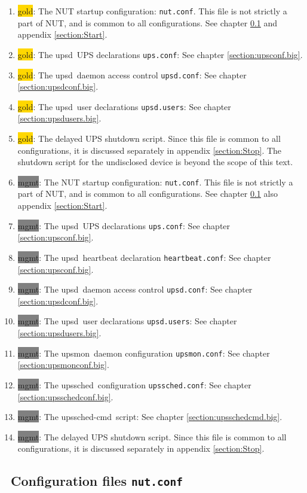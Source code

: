 \documentclass[12pt]{article}
\newlength{\headersep}\setlength{\headersep}{3mm}
\newcommand{\Hsep}{\hspace{\headersep}}
\newcommand{\upsd}{\mbox{\textcolor{UPSDCOLOUR}{upsd}}}
\newcommand{\upsmon}{\mbox{\textcolor{MONCOLOUR}{upsmon}}}
\newcommand{\upssched}{\mbox{\textcolor{SCHEDCOLOUR}{upssched}}}
\newcommand{\upsschedcmd}{\mbox{\textcolor{CMDCOLOUR}{upssched-cmd}}}
\newcommand{\gold}[1][gold]{\colorbox{GOLD}{#1}}
\newcommand{\mgmt}[1][mgmt]{\colorbox{GRAY}{#1}}
\newcommand{\nutconf}{\textcolor{NUTCOLOUR}{\texttt{nut.conf}}}
\newcommand{\upsconf}{\textcolor{UPSDCOLOUR}{\texttt{ups.conf}}}
\newcommand{\heartbeatconf}{\textcolor{UPSDCOLOUR}{\texttt{heartbeat.conf}}}
\newcommand{\upsdconf}{\textcolor{UPSDCOLOUR}{\texttt{upsd.conf}}}
\newcommand{\upsdusers}{\textcolor{UPSDCOLOUR}{\texttt{upsd.users}}}
\newcommand{\upsmonconf}{\textcolor{MONCOLOUR}{\texttt{upsmon.conf}}}
\newcommand{\upsschedconf}{\textcolor{SCHEDCOLOUR}{\texttt{upssched.conf}}}
\newcommand{\ol}{\begin{enumerate}%
   \setlength{\itemsep}{0em}}
\newcommand{\eol}{\end{enumerate}}
\newcommand{\li}{\item}                 %
\newcommand{\refpage}[1]{\ref{#1}}
\begin{document}
\ol

\li \gold: The NUT startup configuration: \nutconf.  This file is not strictly
a part of NUT, and is common to all configurations.  See chapter
\ref{section:nutconf.big} and appendix \refpage{section:Start}.

\li \gold: The \upsd\ UPS declarations \upsconf: See chapter
\ref{section:upsconf.big}.

\li \gold: The \upsd\ daemon access control \upsdconf: See chapter
\ref{section:upsdconf.big}.

\li \gold: The \upsd\ user declarations \upsdusers: See chapter
\ref{section:upsdusers.big}.

\li \gold: The delayed UPS shutdown script.  Since this file is common to all
configurations, it is discussed separately in appendix \refpage{section:Stop}.
The shutdown script for the undisclosed device is beyond the scope of this
text.

\li \mgmt: The NUT startup configuration: \nutconf.  This file is not strictly
a part of NUT, and is common to all configurations.  See chapter
\ref{section:nutconf.big} also appendix \refpage{section:Start}.

\li \mgmt: The \upsd\ UPS declarations \upsconf: See chapter
\ref{section:upsconf.big}.

\li \mgmt: The \upsd\ heartbeat declaration \heartbeatconf: See chapter
\ref{section:upsconf.big}.

\li \mgmt: The \upsd\ daemon access control \upsdconf: See chapter
\ref{section:upsdconf.big}.

\li \mgmt: The \upsd\ user declarations \upsdusers: See chapter
\ref{section:upsdusers.big}.

\li \mgmt: The \upsmon\ daemon configuration \upsmonconf: See chapter
\ref{section:upsmonconf.big}.

\li \mgmt: The \upssched\ configuration \upsschedconf: See chapter
\ref{section:upsschedconf.big}.

\li \mgmt: The \upsschedcmd\ script: See chapter
\ref{section:upsschedcmd.big}.

\li \mgmt: The delayed UPS shutdown script.  Since this file is common to all
configurations, it is discussed separately in appendix \refpage{section:Stop}.

\eol

\subsection{\Hsep\ Configuration files \nutconf}\label{section:nutconf.big}
\end{document}
